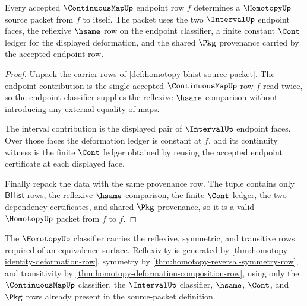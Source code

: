 \begin{theorem}
\label{thm:homotopy-identity-deformation-row}
Every accepted $\ContinuousMapUp$ endpoint row $f$ determines a
$\HomotopyUp$ source packet from $f$ to itself. The packet uses the two
$\IntervalUp$ endpoint faces, the reflexive $\hsame$ row on the endpoint
classifier, a finite constant $\Cont$ ledger for the displayed deformation,
and the shared $\Pkg$ provenance carried by the accepted endpoint row.
\end{theorem}

\begin{proof}
Unpack the carrier rows of \autoref{def:homotopy-bhist-source-packet}. The
endpoint contribution is the single accepted $\ContinuousMapUp$ row $f$ read
twice, so the endpoint classifier supplies the reflexive $\hsame$ comparison
without introducing any external equality of maps.

The interval contribution is the displayed pair of $\IntervalUp$ endpoint
faces. Over those faces the deformation ledger is constant at $f$, and its
continuity witness is the finite $\Cont$ ledger obtained by reusing the
accepted endpoint certificate at each displayed face.

Finally repack the data with the same provenance row. The tuple contains only
$\mathsf{BHist}$ rows, the reflexive $\hsame$ comparison, the finite $\Cont$
ledger, the two dependency certificates, and shared $\Pkg$ provenance, so it
is a valid $\HomotopyUp$ packet from $f$ to $f$.
\end{proof}

\begin{theorem}
\label{thm:homotopy-classifier-equivalence-obligation}
The $\HomotopyUp$ classifier carries the reflexive, symmetric, and transitive
rows required of an equivalence surface. Reflexivity is generated by
\autoref{thm:homotopy-identity-deformation-row}, symmetry by
\autoref{thm:homotopy-reversal-symmetry-row}, and transitivity by
\autoref{thm:homotopy-deformation-composition-row}, using only the
$\ContinuousMapUp$ classifier, the $\IntervalUp$ classifier, $\hsame$,
$\Cont$, and $\Pkg$ rows already present in the source-packet definition.
\end{theorem}

